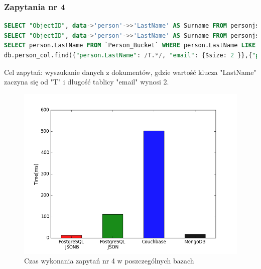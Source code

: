 \documentclass[a4paper,12pt,table]{article}
\begin{document}
{\subsubsection{Zapytania nr 4}
\begin{lstlisting}[language=SQL,basicstyle=\footnotesize]
SELECT "ObjectID", data->'person'->>'LastName' AS Surname FROM personjsonb WHERE data->'person'->>'LastName' LIKE 'T%' AND jsonb_array_length(data->'email')=2;
SELECT "ObjectID", data->'person'->>'LastName' AS Surname FROM personjson WHERE data->'person'->>'LastName' LIKE 'T%' AND json_array_length(data->'email')=2;
SELECT person.LastName FROM `Person_Bucket` WHERE person.LastName LIKE 'T%' AND ARRAY_COUNT(email)=2;
db.person_col.find({"person.LastName": /T.*/, "email": {$size: 2 }},{"person.LastName":1}).pretty();
\end{lstlisting}
\vspace{0.5cm}
Cel zapytań: wyszukanie danych z dokumentów, gdzie wartość klucza "LastName" zaczyna się od "T" i długość tablicy "email" wynosi 2.
\begin{figure}[h]
\begin{center}
\includegraphics[scale=0.5]{ax/fig4}
\end{center}
\caption{Czas wykonania zapytań nr 4 w poszczególnych bazach}
\end{figure}
\newpage
}
\end{document}
